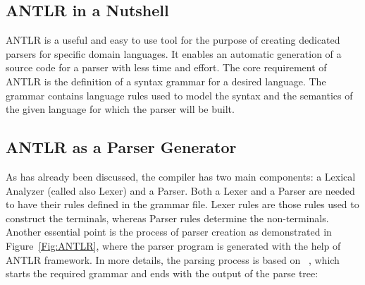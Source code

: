 \subsection{ANTLR in a Nutshell }
ANTLR is a useful and easy to use tool for the purpose of creating dedicated parsers for specific domain languages. 
It enables an automatic generation of a source code for a parser with less time and effort. 
The core requirement of ANTLR is the definition of a syntax grammar for a desired language. 
The grammar contains language rules used to model the syntax and the semantics of the given language for which the parser will be built. 

\subsection{ANTLR as a Parser Generator}
As has already been discussed, the compiler has two main components: a Lexical Analyzer (called also Lexer) and a Parser. 
Both a Lexer and a Parser are needed to have their rules defined in the grammar file. 
Lexer rules are those rules used to construct the terminals, whereas Parser rules determine the non-terminals. 
Another essential point is the process of parser creation as demonstrated in Figure~\ref{Fig:ANTLR}, where the parser program is generated with the help of ANTLR framework. 
In more details, the parsing process is based on ~\cite{ANTLR:Tool:Online}, which starts the required grammar and ends with the output of the parse tree:

